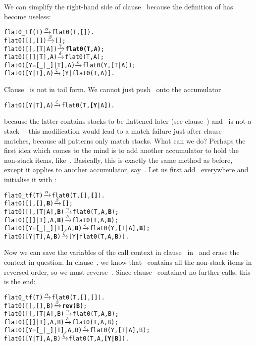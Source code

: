 We can simplify the right\hyp{}hand side of clause~\clause{\gamma}
because the definition of  has become useless:
\begin{alltt}
flat0\_tf(T)              \(\smashedrightarrow{\alpha}\) flat0(T,[]).
flat0(         [],   []) \(\smashedrightarrow{\beta}\) [];
flat0(         [],[T|A]) \(\smashedrightarrow{\gamma}\) \textbf{flat0(T,A)};\hfill% \emph{Simplified}
flat0(     [[]|T],    A) \(\smashedrightarrow{\delta}\) flat0(T,A);
flat0([Y=[\_|\_]|T],    A) \(\smashedrightarrow{\epsilon}\) flat0(Y,[T|A]);
flat0(      [Y|T],    A) \(\smashedrightarrow{\zeta}\) [Y|flat0(T,A)].
\end{alltt}
Clause~\clause{\zeta} is not in tail form. We cannot just
push~ onto the accumulator
\begin{alltt}
flat0(      [Y|T],    A) \(\smashedrightarrow{\zeta}\) flat0(T,\textbf{[Y|}A\textbf{]}).\hfill% \emph{Wrong}
\end{alltt}
because the latter contains stacks to be flattened later (see
clause~\clause{\epsilon}) and ~is not a stack --~this
modification would lead to a match failure just after
clause~\clause{\gamma} matches, because all patterns only match
stacks. What can we do? Perhaps the first idea which comes to the mind
is to add another accumulator to hold the non\hyp{}stack items,
like~. Basically, this is exactly the same method as
before, except it applies to another accumulator, say~. Let
us first add~ everywhere and initialise it with
\erlcode{[]}:
\begin{alltt}
flat0\_tf(T)                \(\smashedrightarrow{\alpha}\) flat0(T,[],\textbf{[]}).
flat0(         [],   [],\textbf{B}) \(\smashedrightarrow{\beta}\) [];\hfill% B \emph{unused yet}
flat0(         [],[T|A],\textbf{B}) \(\smashedrightarrow{\gamma}\) flat0(T,A,\textbf{B});
flat0(     [[]|T],    A,\textbf{B}) \(\smashedrightarrow{\delta}\) flat0(T,A,\textbf{B});
flat0([Y=[\_|\_]|T],    A,\textbf{B}) \(\smashedrightarrow{\epsilon}\) flat0(Y,[T|A],\textbf{B});
flat0(      [Y|T],    A,\textbf{B}) \(\smashedrightarrow{\zeta}\) [Y|flat0(T,A,\textbf{B})].
\end{alltt}
Now we can save the variables of the call context in
clause~\clause{\zeta} in~ and erase the context in
question. In clause~\clause{\beta}, we know that ~contains
all the non\hyp{}stack items in reversed order, so we must
reverse~. Since clause~\clause{\beta} contained no further
calls, this is the end:
\begin{alltt}
flat0\_tf(T)                \(\smashedrightarrow{\alpha}\) flat0(T,[],[]).
flat0(         [],   [],B) \(\smashedrightarrow{\beta}\) \textbf{rev(B)};
flat0(         [],[T|A],B) \(\smashedrightarrow{\gamma}\) flat0(T,A,B);
flat0(     [[]|T],    A,B) \(\smashedrightarrow{\delta}\) flat0(T,A,B);
flat0([Y=[\_|\_]|T],    A,B) \(\smashedrightarrow{\epsilon}\) flat0(Y,[T|A],B);
flat0(      [Y|T],    A,B) \(\smashedrightarrow{\zeta}\) flat0(T,A,\textbf{[Y|B]}).
\end{alltt}
